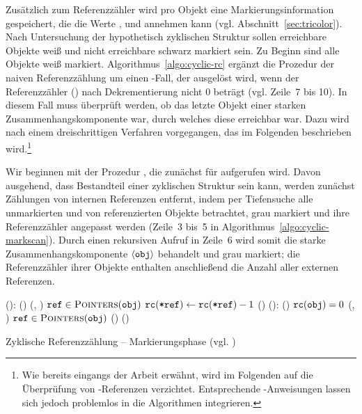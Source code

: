 Zusätzlich zum Referenzzähler wird pro Objekt eine Markierungsinformation gespeichert, die die Werte ,  und  annehmen kann (vgl. Abschnitt~\ref{sec:tricolor}).
Nach Untersuchung der hypothetisch zyklischen Struktur sollen erreichbare Objekte weiß und nicht erreichbare schwarz markiert sein.
Zu Beginn sind alle Objekte weiß markiert.
Algorithmus~\ref{algo:cyclic-rc} ergänzt die Prozedur  der naiven Referenzzählung um einen \ELSE-Fall, der ausgelöst wird, wenn der Referenzzähler () nach Dekrementierung nicht $0$ beträgt (vgl. Zeile~7 bis 10).
In diesem Fall muss überprüft werden, ob  das letzte Objekt einer starken Zusammenhangskomponente war, durch welches diese erreichbar war.
Dazu wird nach einem dreischrittigen Verfahren vorgegangen, das im Folgenden beschrieben wird.\footnote{Wie bereits eingangs der Arbeit erwähnt, wird im Folgenden auf die Überprüfung von \Null-Referenzen verzichtet. Entsprechende \IF-Anweisungen lassen sich jedoch problemlos in die Algorithmen integrieren.}

Wir beginnen mit der Prozedur , die zunächst für  aufgerufen wird.
Davon ausgehend, dass  Bestandteil einer zyklischen Struktur sein kann, werden zunächst Zählungen von internen Referenzen entfernt, indem per Tiefensuche alle unmarkierten und von  referenzierten Objekte betrachtet, grau markiert und ihre Referenzzähler angepasst werden (Zeile~3 bis~5 in Algorithmus~\ref{algo:cyclic-markscan}).
Durch einen rekursiven Aufruf in Zeile~6 wird somit die starke Zusammenhangskomponente $\left\langle\texttt{obj}\right\rangle$ behandelt und grau markiert; die Referenzzähler ihrer Objekte enthalten anschließend die Anzahl aller externen Referenzen.

\begin{algorithm}[h]
\begin{algorithmic}[1]
	\State {}():
	\State \quad \IF {}()
	\State \quad \quad {}(, )
	\State \quad \quad \FOREACH $\texttt{ref} \in \textsc{Pointers}(\texttt{obj})$	
	\State \quad \quad \quad $\texttt{rc}(\texttt{*ref}) \gets \texttt{rc}(\texttt{*ref})-1$ 
	\State \quad \quad \quad {}()	
	\Statex
	\State {}():
	\State \quad \IF {}()
	\State \quad \quad \IF $\texttt{rc}(\texttt{obj}) = 0$	
	\State \quad \quad \quad {}(, )
	\State \quad \quad \quad \FOREACH $\texttt{ref} \in \textsc{Pointers}(\texttt{obj})$
	\State \quad \quad \quad \quad {}()	
	\State \quad \quad \ELSE {}()	
\end{algorithmic}
\caption[Zyklische Referenzzählung -- Markierungsphase]{Zyklische Referenzzählung -- Markierungsphase (vgl. \cite[S. 32f]{martinez1990})}
\label{algo:cyclic-markscan}
\end{algorithm}

